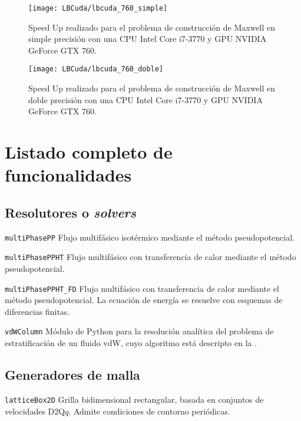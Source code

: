 \begin{figure}[ht]
	\centering
	\texttt{[image: LBCuda/lbcuda\_760\_simple]}
	\caption{Speed Up realizado para el problema de construcci\'on de Maxwell en simple precisi\'on con una CPU Intel Core i7-3770 y GPU NVIDIA GeForce GTX 760.}
	\label{fig:lbcuda_760_simple}
\end{figure}

\begin{figure}[ht]
	\centering
	\texttt{[image: LBCuda/lbcuda\_760\_doble]}
	\caption{Speed Up realizado para el problema de construcci\'on de Maxwell en doble precisi\'on con una CPU Intel Core i7-3770 y GPU NVIDIA GeForce GTX 760.}
	\label{fig:lbcuda_760_doble}
\end{figure}




\section{Listado completo de funcionalidades}

\subsection{Resolutores o \emph{solvers}}

\texttt{multiPhasePP}\: Flujo multif\'asico isot\'ermico mediante el m\'etodo pseudopotencial.
\medskip

\texttt{multiPhasePPHT}\: Flujo multif\'asico con transferencia de calor mediante el m\'etodo pseudopotencial.
\medskip

\texttt{multiPhasePPHT\_FD}\: Flujo multif\'asico con transferencia de calor mediante el m\'etodo pseudopotencial. La ecuaci\'on de energ\'ia se resuelve con esquemas de diferencias finitas.
\medskip

\texttt{vdWColumn}\: M\'odulo de Python para la resoluci\'on anal\'itica del problema de estratificaci\'on de un fluido vdW, cuyo algoritmo est\'a descripto en la .
\medskip



\subsection{Generadores de malla}

\texttt{latticeBox2D}\: Grilla bidimensional rectangular, basada en conjuntos de velocidades D2Q$q$. Admite condiciones de contorno peri\'odicas.
\medskip

